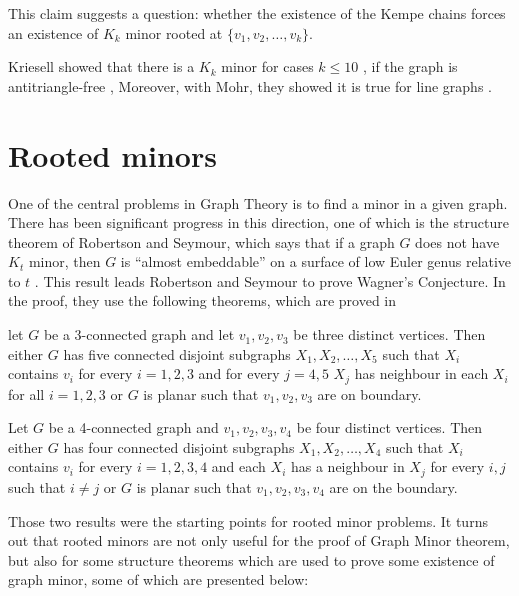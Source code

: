 This claim suggests a question: whether the existence of the Kempe chains forces an existence of $K_k$ minor rooted at
$\{v_1, v_2, \dots, v_k\}$.

Kriesell showed that there is a $K_k$ minor for 
cases $k \leq 10$ \cite{Kriesell2021}, if the graph is antitriangle-free \cite{Kriesell2017}, 
Moreover, with Mohr, they showed it is true for line graphs \cite{Kriesell2021}.

\section{Rooted minors}
One of the central problems in Graph Theory is to find a minor in a given graph. There has been significant progress 
in this direction, one of which is the structure theorem of Robertson and Seymour, which says that if a graph $G$ does not have
$K_t$ minor, then $G$ is ``almost embeddable'' on a surface of low Euler genus relative to $t$ \cite{RobertsonSeymourGM16}. This result leads Robertson and 
Seymour to prove Wagner's Conjecture. In the proof, they use the following theorems, which are proved in \cite{RobertsonSeymourGM20}

\begin{thm}
 let $G$ be a 3-connected graph and let $v_1, v_2, v_3$ be three distinct vertices. Then either $G$ has 
 five connected disjoint subgraphs $X_1, X_2, \dots, X_5$ such that $X_i$ contains $v_i$ for every $i = 1,2,3$
 and for every $j = 4,5$ $X_j$ has neighbour in each $X_i$ for all $i = 1,2,3$ or $G$ is planar such that $v_1, v_2, v_3$ are on boundary.
\end{thm}

\begin{thm}
 Let $G$ be a 4-connected graph and $v_1, v_2, v_3, v_4$ be four distinct vertices. Then either $G$ has 
 four connected disjoint subgraphs $X_1, X_2, \dots, X_4$ such that $X_i$ contains $v_i$ for every $i = 1,2,3,4$ and each
    $X_i$ has a neighbour in $X_j$ for every $i,j$ such that $i \neq j$ or $G$ is planar such that $v_1, v_2, v_3, v_4$ are on 
 the boundary.
\end{thm}

Those two results were the starting points for rooted minor problems. 
\newline
It turns out that rooted minors are not only
useful for the proof of Graph Minor theorem, but also for some structure theorems which are used to prove some existence
of graph minor, some of which are presented below:

